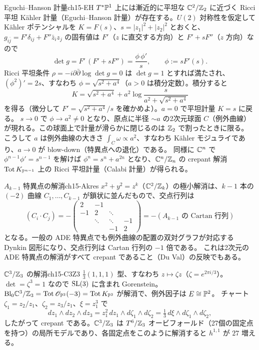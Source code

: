 \begin{myex}{Eguchi--Hanson 計量}{ch15-EH}
$T^*\mathbb{P}^1$ 上には漸近的に平坦な $\mathbb{C}^2/\mathbb{Z}_2$ に近づく Ricci 平坦 K\"ahler 計量（Eguchi--Hanson 計量）が存在する。$U(2)$ 対称性を仮定して K\"ahler ポテンシャルを $K = F(s)$、$s = |z_1|^2+|z_2|^2$ とおくと、
$g_{i\bar j} = F'\delta_{ij} + F''\bar z_iz_j$ の固有値は $F'$（$z$ に直交する方向）と $F'+sF''$（$z$ 方向）なので
\[
\det g = F'\,(F'+sF'') = \frac{\phi\,\phi'}{s},\qquad \phi := sF'(s).
\]
Ricci 平坦条件 $\rho = -i\partial\bar\partial\log\det g = 0$ は $\det g = 1$ とすれば満たされ、$(\phi^2)' = 2s$、すなわち $\phi = \sqrt{s^2+a^4}$（$a>0$ は積分定数）。積分すると
\[
K = \sqrt{s^2+a^4} + a^2\log\frac{s}{a^2+\sqrt{s^2+a^4}}
\]
を得る（微分して $F' = \sqrt{s^2+a^4}/s$ を確かめよ）。$a = 0$ で平坦計量 $K = s$ に戻る。
$s\to0$ で $\phi\to a^2\neq0$ となり、原点に半径 $\sim a$ の2次元球面 $C$（例外曲線）が現れる。この球面上で計量が滑らかに閉じるのは $\mathbb{Z}_2$ で割ったときに限る。
こうして $a$ は例外曲線の大きさ $\int_C\omega\propto a^2$、すなわち K\"ahler モジュライであり、$a\to0$ が blow-down（特異点への退化）である。
同様に $\mathbb{C}^n$ で $\phi^{n-1}\phi' = s^{n-1}$ を解けば $\phi^n = s^n + a^{2n}$ となり、$\mathbb{C}^n/\mathbb{Z}_n$ の crepant 解消 $\text{Tot}\,K_{\mathbb{P}^{n-1}}$ 上の Ricci 平坦計量（Calabi 計量）が得られる。
\end{myex}

\begin{myex}{$A_{k-1}$ 特異点の解消}{ch15-Akres}
$x^2+y^2 = z^k$（$\mathbb{C}^2/\mathbb{Z}_k$）の極小解消は、$k-1$ 本の $(-2)$ 曲線 $C_1,\dots,C_{k-1}$ が鎖状に並んだもので、交点行列は
\[
(C_i\cdot C_j) = -\begin{pmatrix}2&-1&&\\-1&2&\ddots&\\&\ddots&\ddots&-1\\&&-1&2\end{pmatrix} = -(\text{$A_{k-1}$ の Cartan 行列})
\]
となる。一般の ADE 特異点でも例外曲線の配置の双対グラフが対応する Dynkin 図形になり、交点行列は Cartan 行列の $-1$ 倍である。
これは2次元の ADE 特異点の解消がすべて crepant であること（Du Val）の反映でもある。
\end{myex}

\begin{myex}{$\mathbb{C}^3/\mathbb{Z}_3$ の解消}{ch15-C3Z3}
$\frac13(1,1,1)$ 型、すなわち $z\mapsto\zeta z$（$\zeta = e^{2\pi i/3}$）。$\det = \zeta^3 = 1$ なので $\operatorname{SL}(3)$ に含まれ Gorenstein。
$\mathrm{Bl}_0\mathbb{C}^3/\mathbb{Z}_3 = \text{Tot}\,\mathscr{O}_{\mathbb{P}^2}(-3) = \text{Tot}\,K_{\mathbb{P}^2}$ が解消で、例外因子は $E\cong\mathbb{P}^2$。
チャート $\zeta_1 = z_2/z_1$、$\zeta_2 = z_3/z_1$、$\xi = z_1^3$ で
\[
dz_1\wedge dz_2\wedge dz_3 = z_1^2\,dz_1\wedge d\zeta_1\wedge d\zeta_2 = \tfrac13\,d\xi\wedge d\zeta_1\wedge d\zeta_2 ,
\]
したがって crepant である。$\mathbb{C}^3/\mathbb{Z}_3$ は $T^6/\mathbb{Z}_3$ オービフォールド（27個の固定点を持つ）の局所モデルであり、各固定点をこのように解消すると $h^{1,1}$ が $27$ 増える。
\end{myex}

